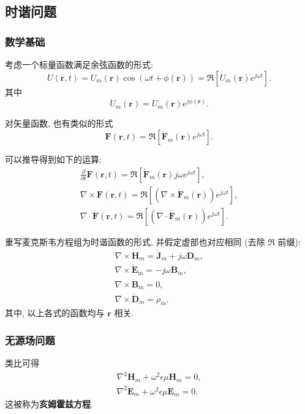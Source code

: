 \subsection{时谐问题}
\subsubsection{数学基础}
考虑一个标量函数满足余弦函数的形式:
\begin{equation}
    U(\bm{r},t)=U_m(\bm{r})\cos(\omega t+\phi(\bm{r}))=\Re[\dot{U}_m(\bm{r})e^{j\omega t}].
\end{equation}
其中
\begin{equation}
    \dot{U}_m(\bm{r})=U_m(\bm{r})e^{j\phi(\bm{r})}.
\end{equation}

对矢量函数, 也有类似的形式
\begin{equation}
    \bm{F}(\bm{r},t)=\Re[\dot{\bm{F}}_m(\bm{r})e^{j\omega t}].
\end{equation}

可以推导得到如下的运算:
\begin{gather}
    \frac{\partial}{\partial t}\bm{F}(\bm{r},t)=\Re[\dot{\bm{F}}_m(\bm{r})j\omega e^{j\omega t}], \\
    \nabla\times\bm{F}(\bm{r},t)=\Re[(\nabla\times\dot{\bm{F}}_m(\bm{r}))e^{j\omega t}], \\
    \nabla\cdot\bm{F}(\bm{r},t)=\Re[(\nabla\cdot\dot{\bm{F}}_m(\bm{r}))e^{j\omega t}].
\end{gather}

重写麦克斯韦方程组为时谐函数的形式, 并假定虚部也对应相同 (去除 $\Re$ 前缀):
\begin{gather}
    \nabla\times\dot{\bm{H}}_m=\dot{\bm{J}}_m+j\omega\dot{\bm{D}}_m, \\
    \nabla\times\dot{\bm{E}}_m=-j\omega\dot{\bm{B}}_m, \\
    \nabla\times\dot{\bm{B}}_m=0, \\
    \nabla\times\dot{\bm{D}}_m=\dot{\rho}_m.
\end{gather}
其中, 以上各式的函数均与 $\bm{r}$ 相关.

\subsubsection{无源场问题}
类比可得
\begin{gather}
    \nabla^2\dot{\bm{H}}_m+\omega^2\epsilon\mu\dot{\bm{H}}_m=0, \\
    \nabla^2\dot{\bm{E}}_m+\omega^2\epsilon\mu\dot{\bm{E}}_m=0.
\end{gather}
这被称为\textbf{亥姆霍兹方程}.
